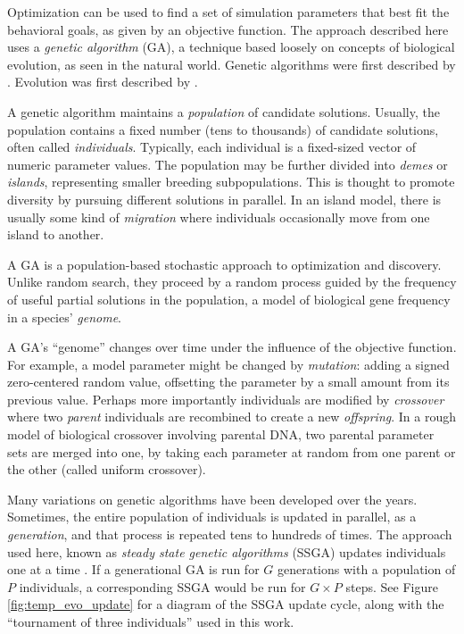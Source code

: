 \documentclass[letterpaper]{article}
\begin{document}
Optimization can be used to find a set of simulation parameters that best fit the behavioral goals, as given by an objective function. The approach described here uses a \textit{genetic algorithm} (GA), a technique based loosely on concepts of biological evolution, as seen in the natural world. Genetic algorithms were first described by \citet{holland_adaptation_1975}. Evolution was first described by \citet{darwin_origin_1859}.

A genetic algorithm maintains a \textit{population} of candidate solutions. Usually, the population contains a fixed number (tens to thousands) of candidate solutions, often called \textit{individuals}. Typically, each individual is a fixed-sized vector of numeric parameter values. The population may be further divided into \textit{demes} or \textit{islands}, representing smaller breeding subpopulations. This is thought to promote diversity by pursuing different solutions in parallel. In an island model, there is usually some kind of \textit{migration} where individuals occasionally move from one island to another.

A GA is a population-based stochastic approach to optimization and discovery. Unlike random search, they proceed by a random process guided by the frequency of useful partial solutions in the population, a model of biological gene frequency in a species' \textit{genome}.

A GA's ``genome'' changes over time under the influence of the objective function. For example, a model parameter might be changed by \textit{mutation}: adding a signed zero-centered random value, offsetting the parameter by a small amount from its previous value. Perhaps more importantly individuals are modified by \textit{crossover} where two \textit{parent} individuals are recombined to create a new \textit{offspring}. In a rough model of biological crossover involving parental DNA, two parental parameter sets are merged into one, by taking each parameter at random from one parent or the other (called uniform crossover).

Many variations on genetic algorithms have been developed over the years. Sometimes, the entire population of individuals is updated in parallel, as a \textit{generation}, and that process is repeated tens to hundreds of times. The approach used here, known as \textit{steady state genetic algorithms} (SSGA) updates individuals one at a time \citep{syswerda_study_1991}. If a generational GA is run for $G$ generations with a population of $P$ individuals, a corresponding SSGA would be run for $G{\times}P$ steps. See Figure \ref{fig:temp_evo_update} for a diagram of the SSGA update cycle, along with the ``tournament of three individuals'' used in this work.
\end{document}
